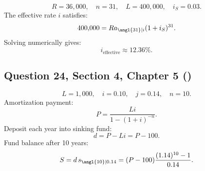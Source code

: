 \documentclass[12pt, a4paper]{article}
\begin{document}
\[
R = 36{,}000, \quad n = 31, \quad L = 400{,}000, \quad i_S = 0.03.
\]
The effective rate \(i\) satisfies:
\[
400{,}000 = R a_{\angl{31}|i}(1 + i_S)^{31}.
\]
Solving numerically gives:
\[
i_{\text{effective}} \approx 12.36\%.
\]

\subsection*{Question 24, Section 4, Chapter 5  (\cite{toi3rd})}

\[
L = 1{,}000, \quad i = 0.10, \quad j = 0.14, \quad n = 10.
\]
Amortization payment:
\[
P = \frac{L i}{1 - (1+i)^{-n}}.
\]
Deposit each year into sinking fund:
\[
d = P - L i = P - 100.
\]
Fund balance after 10 years:
\[
S = d \, s_{\angl{10}|0.14} = (P - 100)\frac{(1.14)^{10} - 1}{0.14}.
\]


\newpage
\printbibliography
\end{document}
